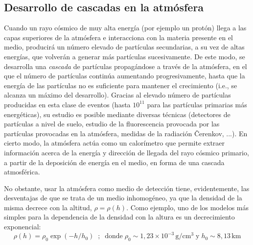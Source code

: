 \documentclass[12 pt, a4paper]{article} %
\numberwithin{equation}{section}
\numberwithin{figure}{section}
\numberwithin{table}{section}
\begin{document}
\subsection{Desarrollo de cascadas en la atmósfera}\label{sec21}

Cuando un rayo cósmico de muy alta energía (por ejemplo un protón) llega a las capas superiores de la atmósfera e interacciona con la materia presente en el medio, producirá un número elevado de partículas secundarias, a su vez de altas energías, que volverán a generar más partículas sucesivamente. De este modo, se desarrolla una \textit{cascada} de partículas propagándose a través de la atmósfera, en el que el número de partículas continúa aumentando progresivamente, hasta que la energía de las partículas no es suficiente para mantener el crecimiento (i.e., se alcanza un máximo del desarrollo). Gracias al elevado número de partículas producidas en esta clase de eventos (hasta $10^{11}$ para las partículas primarias más energéticas), su estudio es posible mediante diversas técnicas (detectores de partículas a nivel de suelo, estudio de la fluorescencia provocada por las partículas provocadas en la atmósfera, medidas de la radiación \v{C}erenkov, ...). En cierto modo, la atmósfera actúa como un calorímetro que permite extraer información acerca de la energía y dirección de llegada del rayo cósmico primario, a partir de la deposición de energía en el medio, en forma de una cascada atmosférica.

No obstante, usar la atmósfera como medio de detección tiene, evidentemente, las desventajas de que se trata de un medio inhomogéneo, ya que la densidad de la misma decrece con la altitud, $\rho = \rho(h)$. Como ejemplo, uno de los modelos más simples para la dependencia de la densidad con la altura es un decrecimiento exponencial:
\begin{equation}
	\rho(h)=\rho_0\exp\left(-h/h_0\right)\; \;;\;\;\text{donde}\;\rho_0\sim1,23\times 10^{-3}\,\mathrm{g/cm^3}\;\text{y}\;h_0\sim8,13\,\mathrm{km}\label{ec21}
\end{equation}
\end{document}
